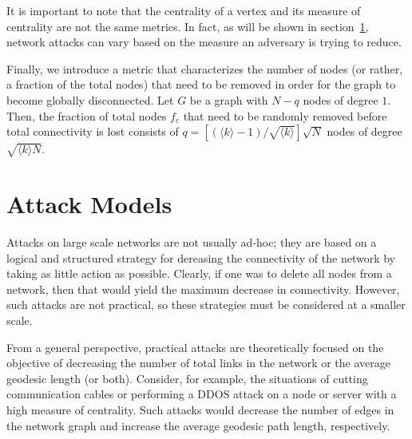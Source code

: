 \documentclass[11pt]{article}
\begin{document}
It is important to note that the centrality of a vertex and its measure of centrality are not the same metrics. In fact, as will be shown in section~\ref{AttackStrategies}, network attacks can vary based on the measure an adversary is trying to reduce. 

Finally, we introduce a metric that characterizes the number of nodes (or rather, a fraction of the total nodes) that need to be removed in order for the graph to become globally disconnected. Let $G$ be a graph with $N - q$ nodes of degree $1$. Then, the fraction of total nodes $f_c$ that need to be randomly removed before total connectivity is lost consists of $q = [(\langle k \rangle - 1) / \sqrt{\langle k \rangle}]\sqrt{N}$ nodes of degree $\sqrt{\langle k \rangle N}$. 





\section{Attack Models}
\label{AttackStrategies}
Attacks on large scale networks are not usually ad-hoc; they are based on a logical and structured strategy for dereasing the connectivity of the network by taking as little action as possible. Clearly, if one was to delete all nodes from a network, then that would yield the maximum decrease in connectivity. However, such attacks are not practical, so these strategies must be considered at a smaller scale. 

From a general perspective, practical attacks are theoretically focused on the objective of decreasing the number of total links in the network or the average geodesic length (or both). Consider, for example, the situations of cutting communication cables or performing a DDOS attack on a node or server with a high measure of centrality. Such attacks would decrease the number of edges in the network graph and increase the average geodesic path length, respectively. 
\end{document}
